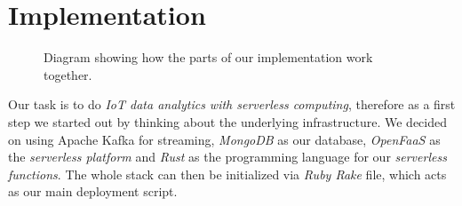 \section{Implementation}

\begin{figure}[H]
  \caption{
    Diagram showing how the parts of our implementation work together.
    \cite{smartphone-icon, browser-icon}
  }
\end{figure}

Our task is to do \textit{IoT data analytics with serverless computing}, therefore as a first step
we started out by thinking about the underlying infrastructure. We decided on using Apache Kafka for
streaming, \textit{MongoDB} as our database, \textit{OpenFaaS} as the \textit{serverless platform} and
\textit{Rust} as the programming language for our \textit{serverless functions}. The whole stack can then be
initialized via \textit{Ruby Rake} file, which acts as our main deployment script.








